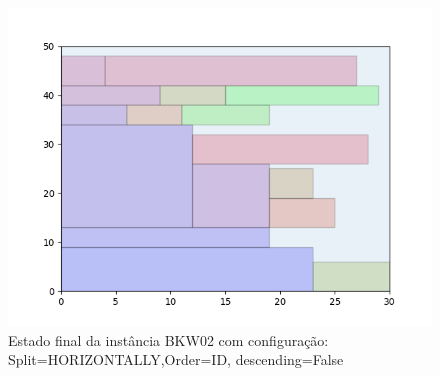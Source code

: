 \begin{figure}[H]
    \centering
    \caption[]{Estado final da instância BKW02 com configuração: Split=HORIZONTALLY,Order=ID, descending=False}
    \label{fig:bkw02-horizontally-id-false}
    \includegraphics[scale=0.5]{output/figures/bkw/bkw02/horizontally/id/false/00}
\end{figure}